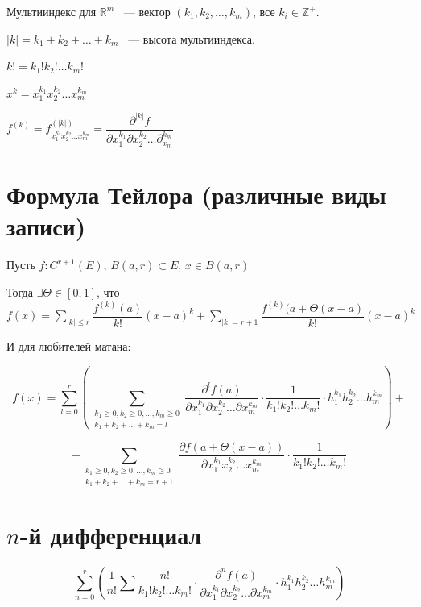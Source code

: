 \documentclass{article}
\begin{document}
        Мультииндекс для $\mathbb{R}^m$ ~--- вектор $(k_1, k_2, \ldots, k_m)$, все $k_i \in \mathbb{Z}^+$.
        
        $\left| k \right| = k_1 + k_2 + \ldots + k_m$ ~--- высота мультииндекса.
        
        $k! = k_1! k_2! \ldots k_m!$
        
        $x^k = x_1^{k_1} x_2^{k_2} \ldots x_m^{k_m}$
        
        $f^{(k)} = f^{(\left| k \right|)}_{x_1^{k_1} x_2^{k_2} \ldots x_m^{k_m}} = \dfrac{\partial^{\left| k \right|} f}{\partial x_1^{k_1} \partial x_2^{k_2} \ldots \partial_{x_m}^{k_m}}$
        
    \newpage
    
    \section{Формула Тейлора (различные виды записи)}
    
        Пусть $f : C^{r + 1} (E)$, $B(a, r) \subset E$, $x \in B(a, r)$
        
        Тогда $\exists \Theta \in [0, 1]$, что $f(x) = \sum\limits_{\left| k \right| \leq r} \dfrac{f^{(k)}(a)}{k!} (x - a)^k + \sum\limits_{\left| k \right| = r + 1} \dfrac{f^{(k)} (a + \Theta (x - a)}{k!} (x - a)^k$
        
        И для любителей матана:
        
        $$f(x) = \sum\limits_{l = 0}^r \left( \sum_{\substack{k_1 \geq 0, k_2 \geq 0, \ldots, k_m \geq 0 \\ k_1 + k_2 + \ldots + k_m = l}} \dfrac{\partial^l f(a)}{\partial x_1^{k_1} \partial x_2^{k_2} \ldots \partial x_m^{k_m}} \cdot \dfrac{1}{k_1! k_2! \ldots k_m!} \cdot h_1^{k_1} h_2^{k_2} \ldots h_m^{k_m} \right) +$$ 
        
        $$ + \sum_{\substack{k_1 \geq 0, k_2 \geq 0, \ldots, k_m \geq 0 \\ k_1 + k_2 + \ldots + k_m = r + 1}} \dfrac{\partial f(a + \Theta (x - a))}{\partial x_1^{k_1} x_2^{k_2} \ldots x_m^{k_m}} \cdot \dfrac{1}{k_1! k_2! \ldots k_m!}$$
        
    \newpage
    
    \section{$n$-й дифференциал}
    
        $$\sum\limits_{n = 0}^r \left( \dfrac{1}{n!} \sum \dfrac{n!}{k_1! k_2! \ldots k_m!} \cdot \dfrac{\partial^n f(a)}{\partial x_1^{k_1} \partial x_2^{k_2} \ldots \partial x_m^{k_m}} \cdot h_1^{k_1} h_2^{k_2} \ldots h_m^{k_m} \right)$$
        
\end{document}
